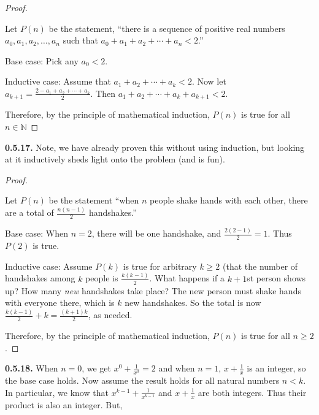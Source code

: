 \documentclass[10pt,]{book}
\theoremstyle{plain}
\theoremstyle{definition}
\theoremstyle{definition}
\theoremstyle{definition}
\theoremstyle{definition}
\numberwithin{equation}{chapter}
\newcommand{\N}{\mathbb N}
\newcommand{\lt}{<}
\begin{document}
\begin{proof}\hypertarget{proof-18}{}
\hypertarget{p-490}{}%
Let \(P(n)\) be the statement, ``there is a sequence of positive real numbers \(a_0, a_1, a_2, \ldots, a_n\) such that \(a_0 + a_1 + a_2 + \cdots + a_n \lt  2\).''%
\par
\hypertarget{p-491}{}%
Base case: Pick any \(a_0 \lt  2\).%
\par
\hypertarget{p-492}{}%
Inductive case: Assume that \(a_1 + a_2 + \cdots + a_k \lt  2\). Now let \(a_{k+1} = \frac{2- a_1 + a_2 + \cdots + a_k}{2}\). Then \(a_1 + a_2 + \cdots +a_k + a_{k+1} \lt  2\).%
\par
\hypertarget{p-493}{}%
Therefore, by the principle of mathematical induction, \(P(n)\) is true for all \(n \in \N\)%
\end{proof}
\par\smallskip
\noindent\textbf{0.5.17.} \hypertarget{p-495}{}%
Note, we have already proven this without using induction, but looking at it inductively sheds light onto the problem (and is fun).%
\begin{proof}\hypertarget{proof-19}{}
\hypertarget{p-496}{}%
Let \(P(n)\) be the statement ``when \(n\) people shake hands with each other, there are a total of \(\frac{n(n-1)}{2}\) handshakes.''%
\par
\hypertarget{p-497}{}%
Base case: When \(n=2\), there will be one handshake, and \(\frac{2(2-1)}{2} = 1\).  Thus \(P(2)\) is true.%
\par
\hypertarget{p-498}{}%
Inductive case: Assume \(P(k)\) is true for arbitrary \(k\ge 2\) (that the number of handshakes among \(k\) people is \(\frac{k(k-1)}{2}\).  What happens if a \(k+1\)st person shows up?  How many \emph{new} handshakes take place?  The new person must shake hands with everyone there, which is \(k\) new  handshakes.  So the total is now \(\frac{k(k-1)}{2} + k = \frac{(k+1)k}{2}\), as needed.%
\par
\hypertarget{p-499}{}%
Therefore, by the principle of mathematical induction, \(P(n)\) is true for all \(n \ge 2\).%
\end{proof}
\par\smallskip
\noindent\textbf{0.5.18.} \hypertarget{p-501}{}%
When \(n = 0\), we get \(x^0 +\frac{1}{x^0} = 2\) and when \(n = 1\), \(x + \frac{1}{x}\) is an integer, so the base case holds. Now assume the result holds for all natural numbers \(n \lt  k\). In particular, we know that \(x^{k-1} + \frac{1}{x^{k-1}}\) and \(x + \frac{1}{x}\) are both integers. Thus their product is also an integer. But,%
\end{document}
